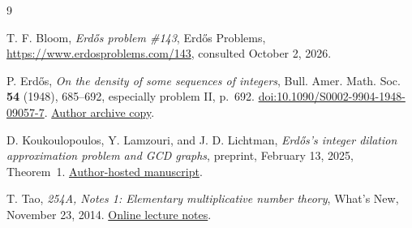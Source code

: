 \documentclass[11pt,reqno]{amsart}
\theoremstyle{definition}
\theoremstyle{remark}
\numberwithin{equation}{section}
\begin{document}
\begin{thebibliography}{9}

T. F. Bloom, \emph{Erd\H{o}s problem \#143}, Erd\H{o}s Problems,
\url{https://www.erdosproblems.com/143}, consulted October 2, 2026.

P. Erd\H{o}s, \emph{On the density of some sequences of integers},
Bull. Amer. Math. Soc. \textbf{54} (1948), 685--692, especially problem II,
p.~692.
\href{https://doi.org/10.1090/S0002-9904-1948-09057-7}{doi:10.1090/S0002-9904-1948-09057-7}.
\href{https://www.renyi.hu/~p_erdos/1948-06.pdf}{Author archive copy}.

D. Koukoulopoulos, Y. Lamzouri, and J. D. Lichtman,
\emph{Erd\H{o}s's integer dilation approximation problem and GCD graphs},
preprint, February 13, 2025, Theorem~1.
\href{https://dms.umontreal.ca/~koukoulo/documents/publications/erdos-integer-dilations.pdf}{Author-hosted manuscript}.

T. Tao, \emph{254A, Notes 1: Elementary multiplicative number theory},
What's New, November 23, 2014.
\href{https://terrytao.wordpress.com/2014/11/23/254a-notes-1-elementary-multiplicative-number-theory/}{Online lecture notes}.

\end{thebibliography}
\end{document}
